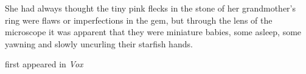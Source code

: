 She had always thought the tiny pink flecks in the stone of her
grandmother's ring were flaws or imperfections in the gem, but through
the lens of the microscope it was apparent that they were miniature
babies, some asleep, some yawning and slowly uncurling their starfish
hands.

first appeared in \emph{Vox}
